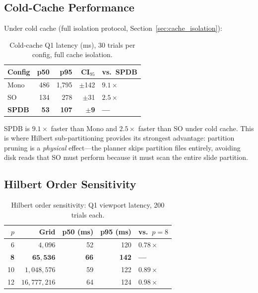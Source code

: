\documentclass[sigconf]{acmart}
\begin{document}
\subsection{Cold-Cache Performance}
\label{sec:cold_cache}

Under cold cache (full isolation protocol, Section~\ref{sec:cache_isolation}):

\begin{table}[t]
\centering
\caption{Cold-cache Q1 latency (ms), 30 trials per config, full cache isolation.}
\label{tab:cold}
\scriptsize
\begin{tabular}{@{}lrrrl@{}}
\toprule
\textbf{Config} & \textbf{p50} & \textbf{p95} & \textbf{CI$_{95}$} & \textbf{vs.\ SPDB} \\
\midrule
Mono & 486 & 1{,}795 & $\pm$142 & $9.1\times$ \\
SO & 134 & 278 & $\pm$31 & $2.5\times$ \\
\textbf{SPDB} & \textbf{53} & \textbf{107} & $\pm$\textbf{9} & \textbf{---} \\
\bottomrule
\end{tabular}
\end{table}

SPDB is $9.1\times$ faster than Mono and $2.5\times$ faster than SO under cold cache.
This is where Hilbert sub-partitioning provides its strongest advantage: partition pruning is a \emph{physical} effect---the planner skips partition files entirely, avoiding disk reads that SO must perform because it must scan the entire slide partition.

\subsection{Hilbert Order Sensitivity}
\label{sec:hilbert_sensitivity}

\begin{table}[t]
\centering
\caption{Hilbert order sensitivity: Q1 viewport latency, 200 trials each.}
\label{tab:hilbert_order}
\scriptsize
\begin{tabular}{@{}rrrrl@{}}
\toprule
$p$ & \textbf{Grid} & \textbf{p50 (ms)} & \textbf{p95 (ms)} & \textbf{vs.\ $p{=}8$} \\
\midrule
6 & $4{,}096$ & 52 & 120 & $0.78\times$ \\
\textbf{8} & $\mathbf{65{,}536}$ & \textbf{66} & \textbf{142} & \textbf{---} \\
10 & $1{,}048{,}576$ & 59 & 122 & $0.89\times$ \\
12 & $16{,}777{,}216$ & 64 & 124 & $0.98\times$ \\
\bottomrule
\end{tabular}
\end{table}
\end{document}
